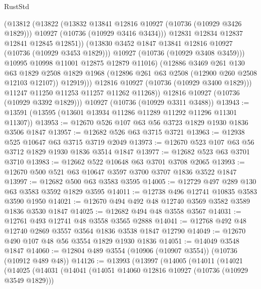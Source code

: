\begin{lexlean}{RustStd}
\begin{coremodule}
                      (@13812
                        (@13822
                          (@13832 @13841 @12816 @10927 (@10736 (@10929 @3426 @1829)))
                          @10927
                          (@10736 (@10929 @3416 @3434)))
                        @12831
                        @12834
                        @12837
                        @12841
                        @12845
                        @12851))
                    (@13830 @3452 @1847 @13841 @12816 @10927 (@10736 (@10929 @3453 @1829)))
                    @10927
                    (@10736 (@10929 @3408 @3459)))
                  @10995
                  @10998
                  @11001
                  @12875
                  @12879
                  @11016)
                (@12886
                  @3469
                  @261
                  @130
                  @63
                  @1829
                  @2508
                  @1829
                  @1968
                  (@12896 @261 @63 @2508 (@12900 @260 @2508 @12103 @12107))
                  @12919)))
            @12816
            @10927
            (@10736 (@10929 @3400 @1829)))
          @11247
          @11250
          @11253
          @11257
          @11262
          @11268))
      @12816
      @10927
      (@10736 (@10929 @3392 @1829)))
    @10927
    (@10736 (@10929 @3311 @3488))
@13943 := @13591 (@13595 (@13601 @13934 @11286 @11289 @11292 @11296 @11301 @11307))
@13953 := @12670 @526 @107 @63 @56 @3723 @1829 @1930 @1836 @3506 @1847
@13957 := @12682 @526 @63 @3715 @3721
@13963 := @12938 @525 @10647 @63 @3715 @3719 @2049
@13973 := @12670 @523 @107 @63 @56 @3712 @1829 @1930 @1836 @3514 @1847
@13977 := @12682 @523 @63 @3701 @3710
@13983 := @12662 @522 @10648 @63 @3701 @3708 @2065
@13993 := @12670 @500 @521 @63 @10647 @3597 @3700 @3707 @1836 @3522 @1847
@13997 := @12682 @500 @63 @3583 @3595
@14005 := @12729 @497 @289 @130 @63 @3583 @3592 @1829 @3595
@14011 := @12738 @496 @12741 @10835 @3583 @3590 @1950
@14021 := @12670 @494 @492 @48 @12740 @3569 @3582 @3589 @1836 @3530 @1847
@14025 := @12682 @494 @48 @3558 @3567
@14031 := @12761 @493 @12741 @48 @3558 @3565 @2888
@14041 := @12768 @492 @48 @12740 @2869 @3557 @3564 @1836 @3538 @1847 @12790
@14049 := @12670 @490 @107 @48 @56 @3554 @1829 @1930 @1836
@14051 := @14049 @3548 @1847
@14060 := @12804 @489 @3554 (@10906 (@10907 @3554)) (@10736 (@10912 @489 @48))
@14126 := @13993
    (@13997
      (@14005
        (@14011
          (@14021
            (@14025
              (@14031
                (@14041
                  (@14051 @14060 @12816 @10927 (@10736 (@10929 @3549 @1829)))

\end{coremodule}
\end{lexlean}
